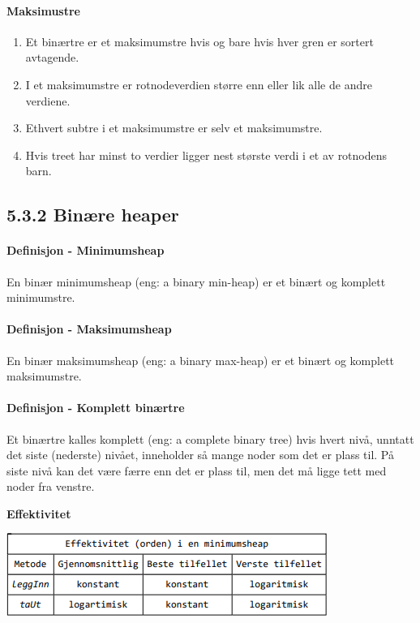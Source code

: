 \documentclass[11pt]{article}
\begin{document}
        \paragraph{Maksimustre}
        \begin{enumerate}
            \item Et binærtre er et maksimumstre hvis og bare hvis hver gren er sortert avtagende.
            \item I et maksimumstre er rotnodeverdien større enn eller lik alle de andre verdiene.
            \item Ethvert subtre i et maksimumstre er selv et maksimumstre.
            \item Hvis treet har minst to verdier ligger nest største verdi i et av rotnodens barn.
        \end{enumerate}

    \subsection{5.3.2 Binære heaper}
        \paragraph{Definisjon - Minimumsheap}
        En binær minimumsheap (eng: a binary min-heap) er et binært
        og komplett minimumstre.

        \paragraph{Definisjon - Maksimumsheap}
        En binær maksimumsheap (eng: a binary max-heap) er et
        binært og komplett maksimumstre.

        \paragraph{Definisjon - Komplett binærtre}
        Et binærtre kalles komplett (eng: a complete binary tree) hvis hvert nivå,
        unntatt det siste (nederste) nivået,
        inneholder så mange noder som det er plass til.
        På siste nivå kan det være færre enn det er plass til,
        men det må ligge tett med noder fra venstre.

        \textbf{Effektivitet}

            \includegraphics[center]{t-5.3.2-1.png}
\end{document}
